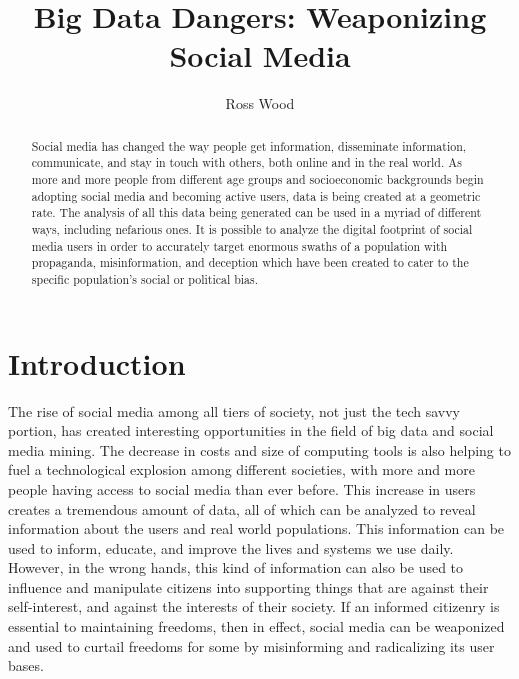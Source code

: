 \documentclass[sigconf]{acmart}
\begin{document}
\title{Big Data Dangers: Weaponizing Social Media}



\author{Ross Wood}

\renewcommand{\shortauthors}{B. Trovato et al.}


\begin{abstract}

  Social media has changed the way people get information, disseminate information,   communicate, and stay in touch with others, both online and in the real world. As more and more people from different age groups and socioeconomic backgrounds begin adopting social media and becoming active users, data is being created at a geometric rate. The analysis of all this data being generated can be used in a myriad of different ways, including nefarious ones. It is possible to analyze the digital footprint of social media users in order to accurately target enormous swaths of a population with propaganda, misinformation, and deception which have been created to cater to the specific population's social or political bias.

\end{abstract}



\maketitle

\section{Introduction}

The rise of social media among all tiers of society, not just the tech savvy portion, has created interesting opportunities in the field of big data and social media mining. The decrease in costs and size of computing tools is also helping to fuel a technological explosion among different societies, with more and more people having access to social media than ever before. This increase in users creates a tremendous amount of data, all of which can be analyzed to reveal information about the users and real world populations. This information can be used to inform, educate, and improve the lives and systems we use daily. However, in the wrong hands, this kind of information can also be used to influence and manipulate citizens into supporting things that are against their self-interest, and against the interests of their society. If an informed citizenry is essential to maintaining freedoms, then in effect, social media can be weaponized and used to curtail freedoms for some by  misinforming and radicalizing its user bases.
\end{document}
